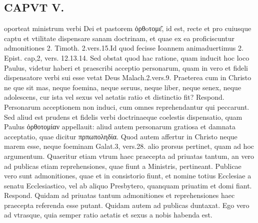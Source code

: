 \documentclass{article}
\begin{document}
\begin{pages}
\section*{CAPVT  V. }
\marginpar{[ p.249 ]}\pstart oporteat ministrum verbi Dei et pastorem ὀρθoτομε͂, id est, recte et pro cuiusque captu et vtilitate dispensare sanam doctrinam, et quae ex ea proficiscuntur admonitiones 2. Timoth. 2.vers.15.Id quod fecisse Ioannem animaduertimus 2. Epist. cap,2, vers. 12.13.14. Sed obstat quod hac ratione, quam inducit hoc loco Paulus, videtur haberi et praescribi acceptio personarum, quam in vero et fideli dispensatore verbi sui esse vetat Deus Malach.2.vers.9. Praeterea cum in Christo ne que sit mas, neque foemina, neque seruus, neque liber, neque senex, neque adolescens, cur ista vel sexus vel aetatis ratio et distinctio fit? Respond. Personarum acceptionem non induci, cum omnes reprehendantur qui peccarunt. Sed aliud est prudens et fidelis verbi doctrinaeque coelestis dispensatio, quam Paulus ὀρθοτομίαν appellauit: aliud autem personarum gratiosa et damnata acceptatio, quae dicitur πρπωποληδία. Quod autem affertur in Christo neque marem esse, neque foeminam Galat.3, vers.28. alio prorsus pertinet, quam ad hoc argumentum. Quaeritur etiam vtrum haec praecepta ad priuatas tantum, an vero ad publicas etiam reprehensiones, quae fiunt a Ministris, pertineant. Publicae vero sunt admonitiones, quae et in consistorio fiunt, et nomine totius Ecclesiae a senatu Ecclesiastico, vel ab aliquo Presbytero, quanquam priuatim et domi fiant. Respond. Quidam ad priuatas tantum admonitiones et reprehensiones haec praecepta referenda esse putant. Quidam autem ad publicas duntaxat. Ego vero ad vtrasque, quia semper ratio aetatis et sexus a nobis habenda est.  \pend

\end{pages}
\end{document}
